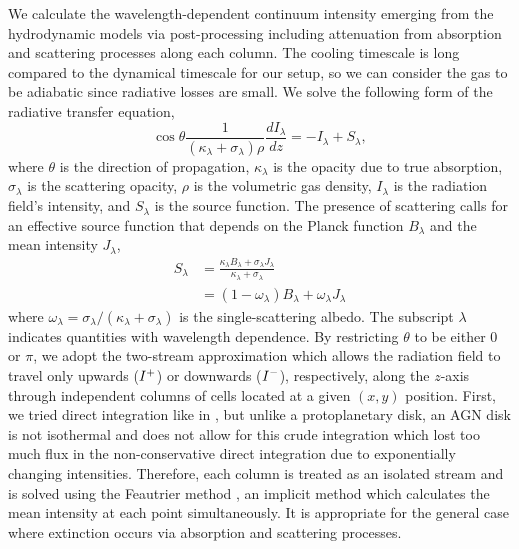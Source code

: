 We calculate the wavelength-dependent continuum intensity emerging from the hydrodynamic models via post-processing including attenuation from absorption and scattering processes along each column.
The cooling timescale is long compared to the dynamical timescale for our setup, so we can consider the gas to be adiabatic since radiative losses are small.
We solve the following form of the radiative transfer equation,
\begin{equation}\label{eqn:RadTrans}
    \cos\theta \frac{1}{(\kappa_\lambda + \sigma_\lambda)\rho} \frac{dI_\lambda}{dz} = -I_\lambda + S_\lambda,
\end{equation}
where $\theta$ is the direction of propagation, $\kappa_\lambda$ is the opacity due to true absorption, $\sigma_\lambda$ is the scattering opacity, $\rho$ is the volumetric gas density, $I_\lambda$ is the radiation field's intensity, and $S_\lambda$ is the source function.
The presence of scattering calls for an effective source function that depends on the Planck function $B_\lambda$ and the mean intensity $J_\lambda$,
\begin{align}
    S_\lambda &= \frac{\kappa_\lambda B_\lambda + \sigma_\lambda J_\lambda}{\kappa_\lambda + \sigma_\lambda}  \nonumber\\
              &= (1-\omega_\lambda) B_{\lambda} + \omega_\lambda J_\lambda \label{eqn:effective_source}
\end{align}
where $\omega_\lambda = \sigma_\lambda / (\kappa_\lambda + \sigma_\lambda)$ is the single-scattering albedo.
The subscript $\lambda$ indicates quantities with wavelength dependence.
By restricting $\theta$ to be either 0 or $\pi$, we adopt the two-stream approximation which allows the radiation field to travel only upwards ($I^+$) or downwards ($I^-$), respectively, along the $z$-axis through independent columns of cells located at a given $(x, y)$ position.
First, we tried direct integration like in \citet{Godines+26}, but unlike a protoplanetary disk, an AGN disk is not isothermal and does not allow for this crude integration which lost too much flux in the non-conservative direct integration due to exponentially changing intensities.
Therefore, each column is treated as an isolated stream and is solved using the Feautrier method \citep{Feautrier64,Cannon70}, an implicit method which calculates the mean intensity at each point simultaneously.
It is appropriate for the general case where extinction occurs via absorption and scattering processes.

